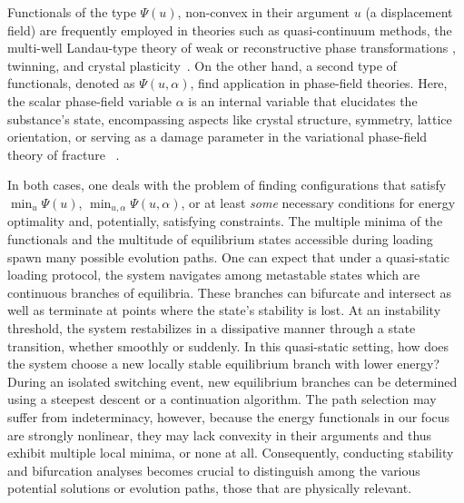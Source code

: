 \documentclass[10pt]{article}
\begin{document}
Functionals of the type $\Psi(u)$, non-convex in their argument  $u$ (a displacement field) are frequently employed in theories such as quasi-continuum methods, the multi-well Landau-type theory of weak or reconstructive phase transformations , twinning, and crystal plasticity~\cite{Tadmor1996-qi,Lookman2003-gd,Conti2004-yj,Finel2010-zw,Clayton2011-xq,Salman2019-cg,Baggio2019-rs,Baggio2023-qu}. On the other hand, a second type of functionals, denoted as $\Psi(u, \alpha)$, find application in phase-field theories. Here, the scalar phase-field variable $\alpha$ is an internal variable that elucidates the substance's state, encompassing aspects like crystal structure, symmetry, lattice orientation, \cite{Finel2010-zw,Ruffini2015-pn,Javanbakht2016-dr} or serving as a damage parameter in the variational phase-field theory of fracture ~\cite{francfort_marigo1998,Salman2021-mn}. 

In both cases, one deals with the problem of finding  configurations that satisfy $\min_{{u}} \Psi({u})$, $\min_{{u},\alpha} \Psi({u},\alpha)$, or at least \emph{some} necessary conditions for energy optimality and, potentially, satisfying constraints. 
The multiple minima of the functionals and the multitude of equilibrium states accessible during loading spawn many possible evolution paths. One can expect that under a quasi-static loading protocol, the system navigates among metastable states which are continuous branches of equilibria. These branches can bifurcate and intersect as well as terminate at points where the state’s stability is lost.
%
At an instability threshold, the system restabilizes in a dissipative manner through a state transition, whether smoothly or suddenly.
In this quasi-static setting, how does the system choose a new locally stable equilibrium branch with lower energy?
During an isolated switching event, new equilibrium branches can be determined using a steepest descent or a continuation algorithm. The path selection may suffer from indeterminacy, however, because the energy functionals in our focus are strongly nonlinear, they may lack convexity in their arguments and thus exhibit multiple local minima, or none at all. Consequently, conducting stability and bifurcation analyses becomes crucial to distinguish among the various potential solutions or evolution paths, those that are physically relevant.
\end{document}
